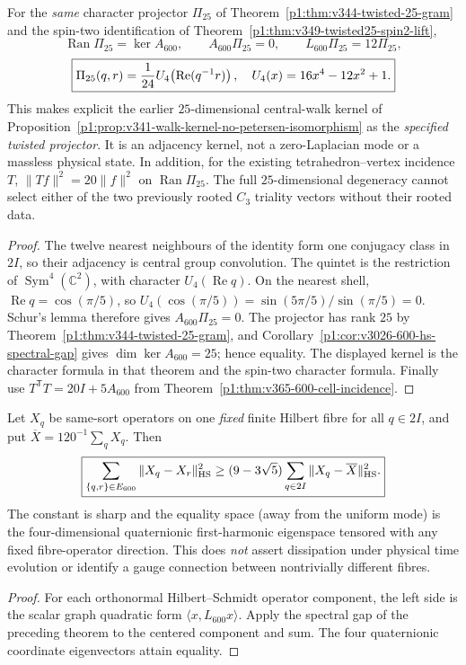 \documentclass[11pt]{article}
\begin{document}
\begin{corollary}
\label{p1:cor:v3026-twisted25-adjacency-kernel}
For the \emph{same} character projector $\Pi_{25}$ of
Theorem~\ref{p1:thm:v344-twisted-25-gram} and the spin-two
identification of Theorem~\ref{p1:thm:v349-twisted25-spin2-lift},
\[
\boxed{\operatorname{Ran}\Pi_{25}=\ker A_{600},\qquad
 A_{600}\Pi_{25}=0,\qquad L_{600}\Pi_{25}=12\Pi_{25},}
\]
\[
\boxed{\Pi_{25}(q,r)={1\over24}U_4\!
   \left(\operatorname{Re}(q^{-1}r)\right),\quad
 U_4(x)=16x^4-12x^2+1.}
\]
This makes explicit the earlier $25$-dimensional central-walk kernel
of Proposition~\ref{p1:prop:v341-walk-kernel-no-petersen-isomorphism}
as the \emph{specified twisted projector}.  It is an adjacency kernel,
not a zero-Laplacian mode or a massless physical state.  In addition,
for the existing tetrahedron--vertex incidence $T$,
$\|T f\|^2=20\|f\|^2$ on $\operatorname{Ran}\Pi_{25}$.
The full $25$-dimensional degeneracy cannot select either of the two
previously rooted $C_3$ triality vectors without their rooted data.
\end{corollary}
\begin{proof}
The twelve nearest neighbours of the identity form one conjugacy
class in $2I$, so their adjacency is central group convolution.
The quintet is the restriction of $\operatorname{Sym}^4(\mathbb C^2)$,
with character $U_4(\operatorname{Re}q)$.  On the nearest shell,
$\operatorname{Re}q=\cos(\pi/5)$, so
$U_4(\cos(\pi/5))=\sin(5\pi/5)/\sin(\pi/5)=0$.
Schur's lemma therefore gives $A_{600}\Pi_{25}=0$.
The projector has rank $25$ by
Theorem~\ref{p1:thm:v344-twisted-25-gram}, and Corollary~\ref{p1:cor:v3026-600-hs-spectral-gap}
gives $\dim\ker A_{600}=25$; hence equality.
The displayed kernel is the character formula in that theorem and
the spin-two character formula.  Finally use
$T^{\mathsf T}T=20I+5A_{600}$ from
Theorem~\ref{p1:thm:v365-600-cell-incidence}.
\end{proof}

\begin{corollary}
\label{p1:cor:v3026-600-hs-dirichlet}
Let $X_q$ be same-sort operators on one \emph{fixed} finite Hilbert
fibre for all $q\in2I$, and put
$\overline X=120^{-1}\sum_q X_q$. Then
\[
\boxed{\sum_{\{q,r\}\in E_{600}}
\|X_q-X_r\|_{\rm HS}^2\ge
(9-3\sqrt5)\sum_{q\in2I}
\|X_q-\overline X\|_{\rm HS}^2.}
\]
The constant is sharp and the equality space (away from the uniform
mode) is the four-dimensional quaternionic first-harmonic eigenspace
tensored with any fixed fibre-operator direction. This does \emph{not}
assert dissipation under physical time evolution or identify a gauge
connection between nontrivially different fibres.
\end{corollary}
\begin{proof}
For each orthonormal Hilbert--Schmidt operator component, the left
side is the scalar graph quadratic form $\langle x,L_{600}x\rangle$.
Apply the spectral gap of the preceding theorem to the centered
component and sum. The four quaternionic coordinate eigenvectors
attain equality.
\end{proof}
\end{document}

